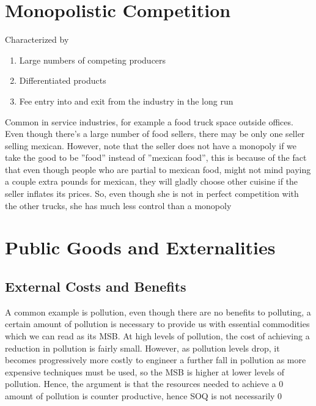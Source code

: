\documentclass[english,course]{Notes}
\begin{document}
\section{Monopolistic Competition}
\par{Characterized by}

\begin{enumerate}
	\item Large numbers of competing producers
	\item Differentiated products
	\item Fee entry into and exit from the industry in the long run
\end{enumerate}

\par{Common in service industries, for example a food truck space outside offices. Even though there's a large number of food sellers, there may be only one seller selling mexican. However, note that the seller does not have a monopoly if we take the good to be ''food'' instead of ''mexican food'', this is because of the fact that even though people who are partial to mexican food, might not mind paying a couple extra pounds for mexican, they will gladly choose other cuisine if  the seller inflates its prices. So, even though she is not in perfect competition with the other trucks, she has much less control than a monopoly }


\section{Public Goods and Externalities} 

\subsection{External Costs and Benefits}




\par{A common example is pollution, even though there are no benefits to polluting, a certain amount of pollution is necessary to provide us with essential commodities which we can read as its MSB. At high levels of pollution, the cost of achieving a reduction in pollution is fairly small. However, as pollution levels drop, it becomes progressively more costly
to engineer a further fall in pollution as more expensive techniques must be used, so the MSB is higher at lower levels of pollution. Hence, the argument is that the resources needed to achieve a $0$ amount of pollution is counter productive, hence SOQ is not necessarily 0}
\end{document}
